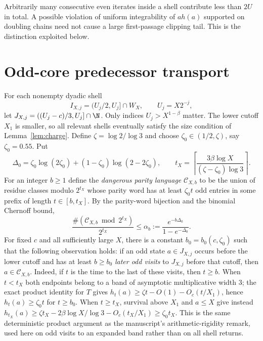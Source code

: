 \begin{remark}
Arbitrarily many consecutive even iterates inside a shell contribute
less than $2U$ in total.  A possible violation of uniform integrability
of $a h(a)$ supported on doubling chains need not cause a large
first-passage clipping tail.  This is the distinction exploited below.
\end{remark}

\section{Odd-core predecessor transport}
For each nonempty dyadic shell
\[
 I_{X,j}=(U_j/2,U_j]\cap W_X,\qquad U_j=X2^{-j},
\]
let $J_{X,j}=((U_j-c)/3,U_j]\cap\N$.
Only indices $U_j>X^{1-\beta}$ matter.  The lower cutoff $X_1$
is smaller, so all relevant shells eventually satisfy the size
condition of Lemma~\ref{lem:charge}.  Define $\zeta=\log2/\log3$
and choose $\zeta_0\in(1/2,\zeta)$, say $\zeta_0=0.55$.  Put
\[
 \Delta_0=\zeta_0\log(2\zeta_0)+(1-\zeta_0)\log(2-2\zeta_0),
 \qquad
 t_X=\left\lceil\frac{3\beta\log X}{(\zeta-\zeta_0)\log3}\right\rceil.
\]
For an integer $b\ge1$ define the \emph{dangerous parity language}
$\mathcal C_{X,b}$ to be the union of residue classes modulo
$2^{t_X}$ whose parity word has at least $\zeta_0t$ odd entries
in some prefix of length $t\in[b,t_X]$.
By the parity-word bijection and the binomial Chernoff bound,
\begin{equation}\label{eq:sparse}
 \frac{\#(\mathcal C_{X,b}\bmod2^{t_X})}{2^{t_X}}
 \le\alpha_b:=\frac{e^{-b\Delta_0}}{1-e^{-\Delta_0}}.
\end{equation}
For fixed $c$ and all sufficiently large $X$, there is a constant
$b_0=b_0(c,\zeta_0)$ such that the following observation holds:
if an odd state $a\in J_{X,j}$ occurs before the lower cutoff and
has at least $b\ge b_0$ \emph{later odd visits} to $J_{X,j}$ before
that cutoff, then $a\in\mathcal C_{X,b}$.  Indeed, if $t$ is the time
to the last of these visits, then $t\ge b$.  When $t<t_X$ both
endpoints belong to a band of asymptotic multiplicative width $3$;
the exact product identity for $T$ gives
$h_t(a)\ge\zeta t-O(1)-O_c(t/X_1)$, hence
$h_t(a)\ge\zeta_0t$ for $t\ge b_0$.  When $t\ge t_X$, survival
above $X_1$ and $a\le X$ give instead
$h_{t_X}(a)\ge\zeta t_X-2\beta\log X/\log3
-O_c(t_X/X_1)\ge\zeta_0t_X$.
This is the same deterministic product argument as the manuscript's
arithmetic-rigidity remark, used here on odd visits to an expanded
band rather than on all shell returns.

